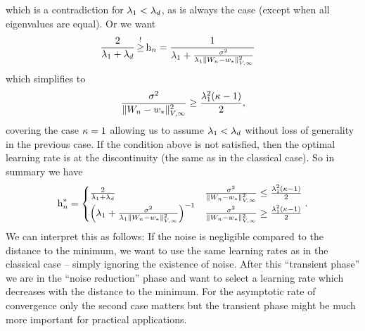 which is a contradiction for \(\lambda_1 < \lambda_d\), as is
always the case (except when all eigenvalues are equal). Or we want
\begin{align*}
	&\frac{2}{\hesseEV_1+\hesseEV_\dimension} \xge{!} \lr_n
	= \frac{1}{
		\hesseEV_1 + \frac{\stdBound^2}{
			\hesseEV_1\|\Weights_n-\minimum\|_{V,\infty}^2
		}
	}
\end{align*}
which simplifies to
\begin{align*}
	\frac{\sigma^2}{
		\|W_n-w_*\|_{V,\infty}^2
	}
	\ge\frac{\lambda_1^2(\kappa-1)}{2},
\end{align*}
covering the case \(\kappa=1\) allowing us to assume \(\lambda_1 <
\lambda_d\) without loss of generality in the previous case. If
the condition above is not satisfied, then the optimal learning rate is at the
discontinuity (the same as in the classical case). So in summary we have
\begin{align*}
	\text{h}_n^* = \begin{cases}
		\frac{2}{\lambda_1+\lambda_d}
		&\frac{\sigma^2}{
			\|W_n-w_*\|_{V,\infty}^2
		}
		\le \frac{\lambda_1^2(\kappa-1)}{2}\\
		\left(
			\lambda_1 + \frac{\sigma^2}{
				\lambda_1\|W_n-w_*\|_{V,\infty}^2
			}
		\right)^{-1}
		&\frac{\sigma^2}{
			\|W_n-w_*\|_{V,\infty}^2
		}
		\ge \frac{\lambda_1^2(\kappa-1)}{2}
	\end{cases}.
\end{align*}
We can interpret this as follows: If the noise is negligible compared to the
distance to the minimum, we want to use the same learning rates as in the
classical case -- simply ignoring the existence of noise. After this ``transient
phase'' we are in the ``noise reduction'' phase and want to select a learning rate
which decreases with the distance to the minimum. For the asymptotic rate of
convergence only the second case matters but the transient phase might be much
more important for practical applications.

